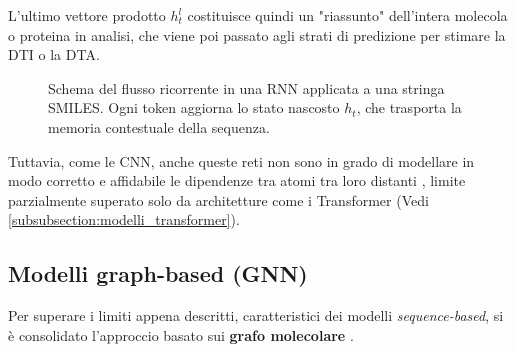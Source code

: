 L'ultimo vettore prodotto $h_t^l$ costituisce quindi un "riassunto" dell'intera molecola o proteina in analisi, che viene poi passato agli strati di predizione per stimare la DTI o la DTA.
\begin{figure}[ht]
    \centering
                \caption{Schema del flusso ricorrente in una RNN applicata a una stringa SMILES. Ogni token aggiorna lo stato nascosto $h_t$, che trasporta la memoria contestuale della sequenza.}
                \label{fig:rnn_smiles}
            \end{figure}

Tuttavia, come le CNN, anche queste reti non sono in grado di modellare
in modo corretto e affidabile le dipendenze tra atomi tra loro distanti
\cite{wangUnifiedSurveyDrugtarget2026a}, limite parzialmente superato solo da architetture come i Transformer (Vedi \ref{subsubsection:modelli_transformer}).

\subsection{Modelli graph-based (GNN)}
\label{subsec:gnn}
Per superare i limiti appena descritti, caratteristici dei modelli \textit{sequence-based}, si è consolidato l'approccio basato sui \textbf{grafo molecolare}
\cite{wangUnifiedSurveyDrugtarget2026a}.


